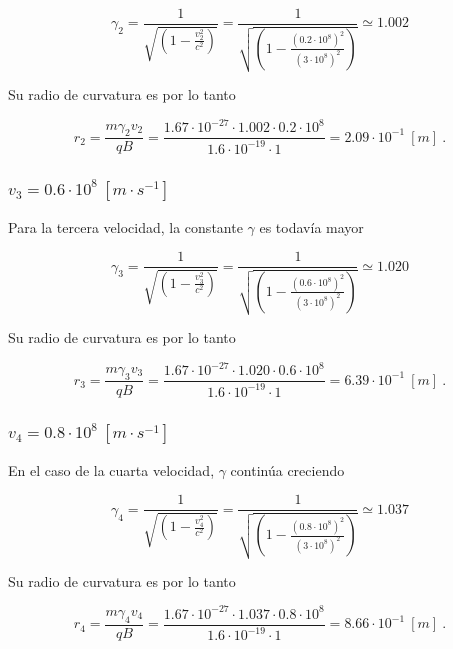 \documentclass[journal]{IEEEtran}
\begin{document}
\begin{equation}
\gamma_2 = \displaystyle\frac{1}{\sqrt{(1-\displaystyle\frac{v_2^2}{c^2})}} = \displaystyle\frac{1}{\sqrt{(1-\displaystyle\frac{(0.2\cdot 10^8)^2}{(3\cdot 10^8)^2})}} \simeq 1.002
\end{equation}

Su radio de curvatura es por lo tanto

\begin{equation}
r_2 = \displaystyle\frac{m\gamma_2v_2}{qB} = \displaystyle\frac{1.67\cdot 10^{-27}\cdot 1.002 \cdot 0.2\cdot 10^8}{1.6\cdot 10^{-19}\cdot 1} = 2.09\cdot 10^{-1}~[m]~.
\end{equation}

\subsubsection{$v_3 = 0.6\cdot 10^8~[m\cdot s^{-1}]$}

Para la tercera velocidad, la constante $\gamma$ es todavía mayor

\begin{equation}
\gamma_3 = \displaystyle\frac{1}{\sqrt{(1-\displaystyle\frac{v_3^2}{c^2})}} = \displaystyle\frac{1}{\sqrt{(1-\displaystyle\frac{(0.6\cdot 10^8)^2}{(3\cdot 10^8)^2})}} \simeq 1.020
\end{equation}

Su radio de curvatura es por lo tanto

\begin{equation}
r_3 = \displaystyle\frac{m\gamma_3v_3}{qB} = \displaystyle\frac{1.67\cdot 10^{-27}\cdot 1.020 \cdot 0.6\cdot 10^8}{1.6\cdot 10^{-19}\cdot 1} = 6.39\cdot 10^{-1}~[m]~.
\end{equation}

\subsubsection{$v_4 = 0.8\cdot 10^8~[m\cdot s^{-1}]$}

En el caso de la cuarta velocidad, $\gamma$ continúa creciendo

\begin{equation}
\gamma_4 = \displaystyle\frac{1}{\sqrt{(1-\displaystyle\frac{v_4^2}{c^2})}} = \displaystyle\frac{1}{\sqrt{(1-\displaystyle\frac{(0.8\cdot 10^8)^2}{(3\cdot 10^8)^2})}} \simeq 1.037
\end{equation}

Su radio de curvatura es por lo tanto

\begin{equation}
r_4 = \displaystyle\frac{m\gamma_4v_4}{qB} = \displaystyle\frac{1.67\cdot 10^{-27}\cdot 1.037 \cdot 0.8\cdot 10^8}{1.6\cdot 10^{-19}\cdot 1} = 8.66\cdot 10^{-1}~[m]~.
\end{equation}
\end{document}
